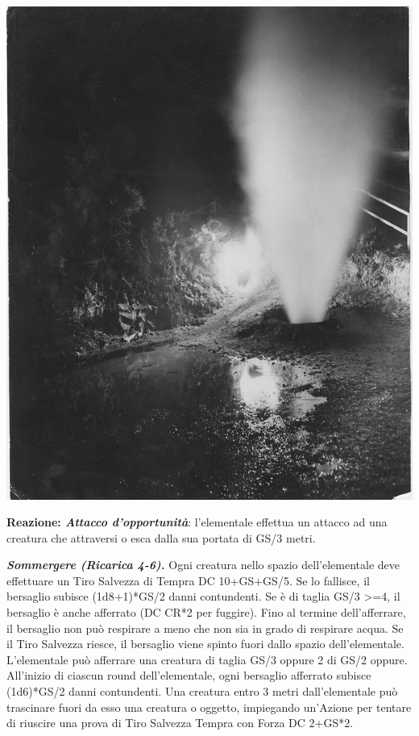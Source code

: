 \begin{multicols}{2}
{\begin{center}
\includegraphics[width=0.9\linewidth]{immagini/geyser.png}
\end{center}

\textbf{Reazione: \emph{Attacco d'opportunità}}: l'elementale effettua un attacco ad una creatura che attraversi o esca dalla sua portata di GS/3 metri.

\emph{\textbf{Sommergere (Ricarica 4-6).}} Ogni creatura nello spazio dell'elementale deve effettuare un Tiro Salvezza di Tempra DC 10+GS+GS/5. Se lo fallisce, il bersaglio subisce (1d8+1)*GS/2 danni contundenti. Se è di taglia GS/3 >=4, il bersaglio è anche afferrato (DC CR*2 per fuggire). Fino al termine dell'afferrare, il bersaglio non può respirare a meno che non sia in grado di respirare acqua. Se il Tiro Salvezza riesce, il bersaglio viene spinto fuori dallo spazio dell'elementale.\\
L'elementale può afferrare una creatura di taglia GS/3 oppure 2 di GS/2 oppure. All'inizio di ciascun round dell'elementale, ogni bersaglio afferrato subisce (1d6)*GS/2 danni contundenti. Una creatura entro 3 metri dall'elementale può trascinare fuori da esso una creatura o oggetto, impiegando un'Azione per tentare di riuscire una prova di Tiro Salvezza Tempra con Forza DC 2+GS*2.\\

}
\end{multicols}
